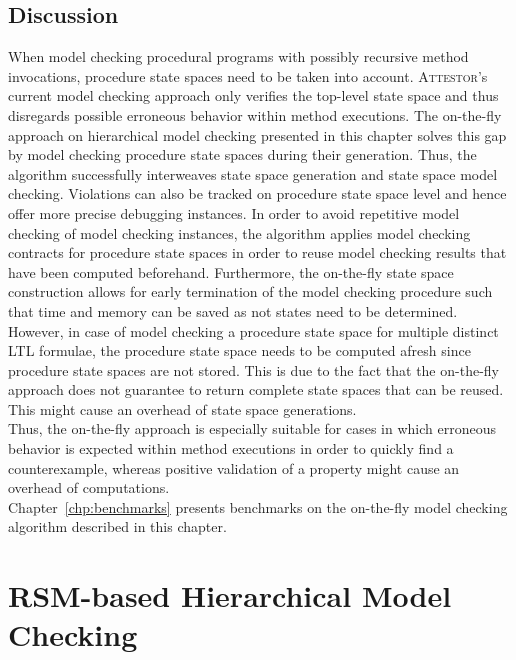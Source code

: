 \documentclass[a4paper, 12pt, twoside]{report}
\begin{document}
	\section{Discussion}
	
	When model checking procedural programs with possibly recursive method invocations, procedure state spaces need to be taken into account. \textsc{Attestor}'s current model checking approach only verifies the top-level state space and thus disregards possible erroneous behavior within method executions. The on-the-fly approach on hierarchical model checking presented in this chapter solves this gap by model checking procedure state spaces during their generation. Thus, the algorithm successfully interweaves state space generation and state space model checking. Violations can also be tracked on procedure state space level and hence offer more precise debugging instances. In order to avoid repetitive model checking of model checking instances, the algorithm applies model checking contracts for procedure state spaces in order to reuse model checking results that have been computed beforehand. Furthermore, the on-the-fly state space construction allows for early termination of the model checking procedure such that time and memory can be saved as not states need to be determined. \\
	
	However, in case of model checking a procedure state space for multiple distinct LTL formulae, the procedure state space needs to be computed afresh since procedure state spaces are not stored. This is due to the fact that the on-the-fly approach does not guarantee to return complete state spaces that can be reused. This might cause an overhead of state space generations.\\
	
	Thus, the on-the-fly approach is especially suitable for cases in which erroneous behavior is expected within method executions in order to quickly find a counterexample, whereas positive validation of a property might cause an overhead of computations. \\
	
	Chapter~\ref{chp:benchmarks} presents benchmarks on the on-the-fly model checking algorithm described in this chapter.
		
	
	
	\chapter{RSM-based Hierarchical Model Checking}\label{chp:hmc}
\end{document}
